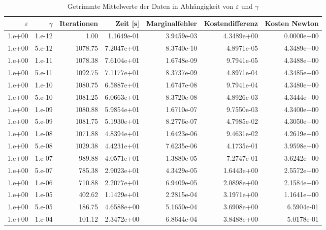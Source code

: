 \begin{table}[htbp]
\caption{Getrimmte Mittelwerte der Daten in Abhängigkeit von $\varepsilon$ und $\gamma$}
\label{tab:Parametertest512}
\small
\centering
{}
\begin{tabular}{rrrrrrr}
\toprule
$\varepsilon$ & $\gamma$ & Iterationen & Zeit [s] & Marginalfehler & Kostendifferenz & Kosten Newton \\
\midrule
1.e+00 & 1.e-12 & 1.00 & 1.1649e-01 & 3.9459e-03 & 4.3489e+00 & 0.0000e+00 \\
1.e+00 & 5.e-12 & 1078.75 & 7.2047e+01 & 8.3740e-10 & 4.8971e-05 & 4.3489e+00 \\
1.e+00 & 1.e-11 & 1078.38 & 7.6104e+01 & 1.6748e-09 & 9.7941e-05 & 4.3488e+00 \\
1.e+00 & 5.e-11 & 1092.75 & 7.1177e+01 & 8.3737e-09 & 4.8971e-04 & 4.3485e+00 \\
1.e+00 & 1.e-10 & 1080.75 & 6.5887e+01 & 1.6747e-08 & 9.7941e-04 & 4.3480e+00 \\
1.e+00 & 5.e-10 & 1081.25 & 6.0663e+01 & 8.3720e-08 & 4.8926e-03 & 4.3444e+00 \\
1.e+00 & 1.e-09 & 1080.88 & 5.9854e+01 & 1.6710e-07 & 9.7550e-03 & 4.3400e+00 \\
1.e+00 & 5.e-09 & 1081.75 & 5.1930e+01 & 8.2776e-07 & 4.7985e-02 & 4.3050e+00 \\
1.e+00 & 1.e-08 & 1071.88 & 4.8394e+01 & 1.6423e-06 & 9.4631e-02 & 4.2619e+00 \\
1.e+00 & 5.e-08 & 1029.38 & 4.4231e+01 & 7.6235e-06 & 4.1735e-01 & 3.9598e+00 \\
1.e+00 & 1.e-07 & 989.88 & 4.0571e+01 & 1.3880e-05 & 7.2747e-01 & 3.6242e+00 \\
1.e+00 & 5.e-07 & 785.38 & 2.9023e+01 & 4.3429e-05 & 1.6443e+00 & 2.5572e+00 \\
1.e+00 & 1.e-06 & 710.88 & 2.2077e+01 & 6.9409e-05 & 2.0898e+00 & 2.1584e+00 \\
1.e+00 & 1.e-05 & 402.62 & 1.1429e+01 & 2.2815e-04 & 3.1971e+00 & 1.1641e+00 \\
1.e+00 & 5.e-05 & 186.75 & 4.6588e+00 & 5.1650e-04 & 3.6908e+00 & 6.5904e-01 \\
1.e+00 & 1.e-04 & 101.12 & 2.3472e+00 & 6.8644e-04 & 3.8488e+00 & 5.0178e-01 \\
\bottomrule
\end{tabular}
\end{table}
